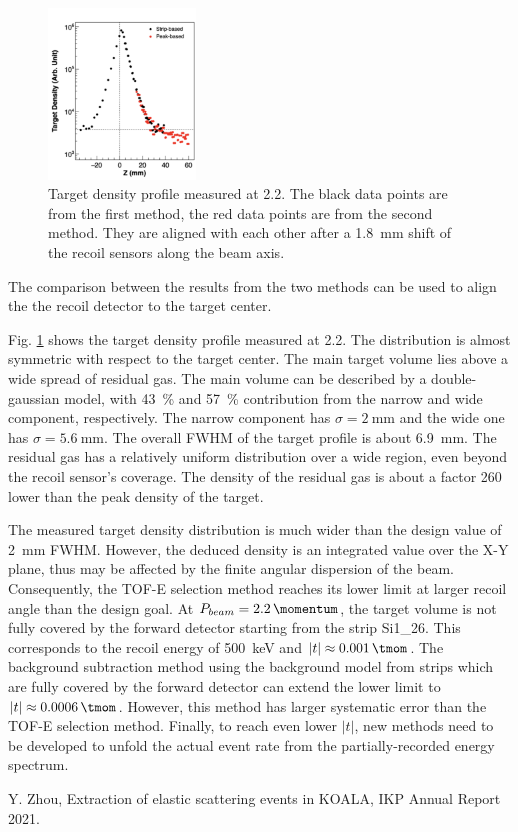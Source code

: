 \documentclass[fleqn,twocolumn,a4paper]{ikpar}
\begin{document}
\begin{figure}[t!]
  \centering
	\includegraphics[width=0.35\textwidth]{./target_density_result.png}
  \caption{Target density profile measured at \SI{2.2}{\momentum}. The black
    data points are from the first method, the red data points are from the
    second method. They are aligned with each other after a \SI{1.8}{\mm} shift of
    the recoil sensors along the beam axis.}
  \label{fig:target_density_result}
\end{figure}
The comparison between the results from the two methods can be used to align the the recoil detector to the target center.

\par
\medskip

Fig. \ref{fig:target_density_result} shows the target density profile measured at
\SI{2.2}{\momentum}.
The distribution is almost symmetric with respect to the target center.
The main target volume lies above a wide spread of residual gas.
The main volume can be described by a double-gaussian model, with
\SI{43}{\percent} and \SI{57}{\percent} contribution from the narrow and wide
component, respectively.
The narrow component has $\sigma = \SI{2}{\mm}$ and the wide one has $\sigma = \SI{5.6}{\mm}$.
The overall FWHM of the target profile is about \SI{6.9}{mm}.
The residual gas has a relatively uniform distribution over a wide region, even
beyond the recoil sensor's coverage.
The density of the residual gas is about a factor 260 lower than the peak density of the target.

\par
\medskip

The measured target density distribution is much wider than the design value of \SI{2}{\mm} FWHM.
However, the deduced density is an integrated value over the X-Y plane, thus
may be affected by the finite angular dispersion of the beam.
Consequently, the TOF-E selection method reaches its lower limit at larger recoil angle than the design goal.
At $P_{beam}=\SI{2.2}{\momentum}$, the target volume is not fully covered by
the forward detector starting from the strip Si1\_26.
This corresponds to the recoil energy of \SI{500}{\keV} and $|t| \approx \SI{0.001}{\tmom}$.
The background subtraction method using the background model from strips which
are fully covered by the forward detector can extend the lower limit to $|t| \approx \SI{0.0006}{\tmom}$.
However, this method has larger systematic error than the TOF-E selection method.
Finally, to reach even lower $|t|$, new methods need to be developed to unfold the
actual event rate from the partially-recorded energy spectrum.

\par
\medskip

\begin{thebibliography}{99}
 Y. Zhou, Extraction of elastic scattering events in KOALA, IKP Annual Report 2021.
\end{thebibliography}
\end{document}
